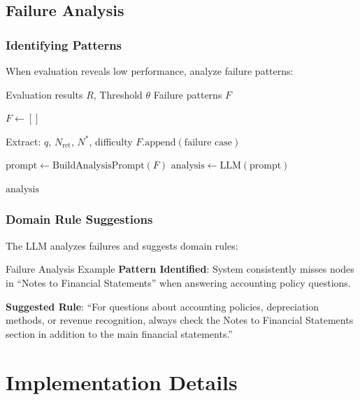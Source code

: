 \subsection{Failure Analysis}

\subsubsection{Identifying Patterns}

When evaluation reveals low performance, analyze failure patterns:

\begin{algorithm}[H]
\caption{Analyze Failures}
\begin{algorithmic}[1]
\Require Evaluation results $R$, Threshold $\theta$
\Ensure Failure patterns $F$

\State $F \gets []$

        \State Extract: $q$, $N_{\text{ret}}$, $N^*$, difficulty
        \State $F.\text{append}(\text{failure case})$
    \EndIf
\EndFor

\State $\text{prompt} \gets \text{BuildAnalysisPrompt}(F)$
\State $\text{analysis} \gets \text{LLM}(\text{prompt})$

\State \Return $\text{analysis}$
\end{algorithmic}
\end{algorithm}

\subsubsection{Domain Rule Suggestions}

The LLM analyzes failures and suggests domain rules:

\begin{examplebox}{Failure Analysis Example}
\textbf{Pattern Identified}: 
System consistently misses nodes in ``Notes to Financial Statements'' when answering accounting policy questions.

\textbf{Suggested Rule}:
``For questions about accounting policies, depreciation methods, or revenue recognition, always check the Notes to Financial Statements section in addition to the main financial statements.''
\end{examplebox}

\section{Implementation Details}

